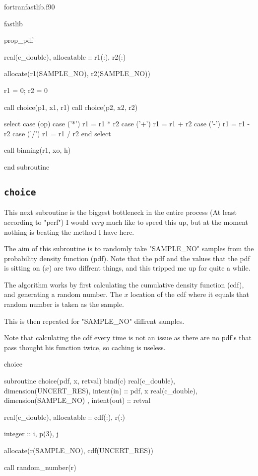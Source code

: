 \documentclass[10pt, a4paper]{article}
\begin{document}
\begin{subfile}{fortran}{fastlib.f90}
\begin{codeblock}[noref]{fastlib}
\begin{codeblock}{prop_pdf}
\begin{code}
	real(c_double), allocatable :: r1(:), r2(:)
	
	allocate(r1(SAMPLE_NO), r2(SAMPLE_NO))
	
	r1 = 0; r2 = 0
	
	call choice(p1, x1, r1)
	call choice(p2, x2, r2)
	
	select case (op)
	case ('*')
		r1 = r1 * r2 
	case ('+')
		r1 = r1 + r2 
	case ('-')
		r1 = r1 - r2 
	case ('/')
		r1 = r1 / r2 
	end select
	
	call binning(r1, xo, h)
	
end subroutine
\end{code}
\end{codeblock}

\subsection{\texttt{choice}}

This next subroutine is the biggest bottleneck in the entire process (At least according to "perf") I would \emph{very} much like to speed this up, but at the moment nothing is beating the method I have here. 

The aim of this subroutine is to randomly take "SAMPLE_NO" samples from the probability density function (pdf). 
Note that the pdf and the values that the pdf is sitting on ($x$) are two diffrent things, and this tripped me up for quite a while. 

The algorithm works by first calculating the cumulative density function (cdf), and generating a random number. 
The $x$ location of the cdf where it equals that random number is taken as the sample. 

This is then repeated for "SAMPLE_NO" diffrent samples. 

Note that calculating the cdf every time is not an issue as there are no pdf's that pass thought his function twice, so caching is useless. 

\begin{codeblock}{choice}
\begin{code}
subroutine choice(pdf, x, retval) bind(c)
	real(c_double), dimension(UNCERT_RES), intent(in)  :: pdf, x
	real(c_double), dimension(SAMPLE_NO)  , intent(out) :: retval
	
	real(c_double), allocatable :: cdf(:), r(:)
	
	integer :: i, p(3), j
	
	allocate(r(SAMPLE_NO), cdf(UNCERT_RES))
	
	call random_number(r)
	

\end{code}
\end{codeblock}
\end{codeblock}
\end{subfile}
\end{document}

